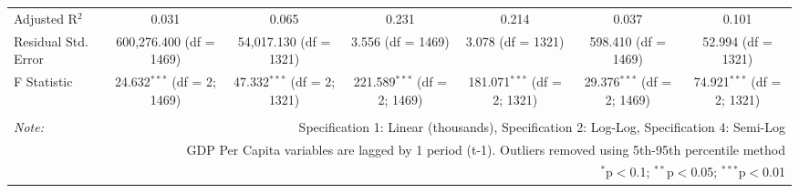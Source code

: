 \begin{table}[!htbp]
\begin{tabular}{@{\extracolsep{5pt}}lcccccc}
Adjusted R$^{2}$ & 0.031 & 0.065 & 0.231 & 0.214 & 0.037 & 0.101 \\
Residual Std. Error & 600,276.400 (df = 1469) & 54,017.130 (df = 1321) & 3.556 (df = 1469) & 3.078 (df = 1321) & 598.410 (df = 1469) & 52.994 (df = 1321) \\
F Statistic & 24.632$^{***}$ (df = 2; 1469) & 47.332$^{***}$ (df = 2; 1321) & 221.589$^{***}$ (df = 2; 1469) & 181.071$^{***}$ (df = 2; 1321) & 29.376$^{***}$ (df = 2; 1469) & 74.921$^{***}$ (df = 2; 1321) \\
\hline
\hline \\[-1.8ex]
\textit{Note:}  & \multicolumn{6}{r}{Specification 1: Linear (thousands), Specification 2: Log-Log, Specification 4: Semi-Log} \\
 & \multicolumn{6}{r}{GDP Per Capita variables are lagged by 1 period (t-1). Outliers removed using 5th-95th percentile method} \\
 & \multicolumn{6}{r}{$^{*}$p$<$0.1; $^{**}$p$<$0.05; $^{***}$p$<$0.01} \\
\end{tabular}
\end{table}
